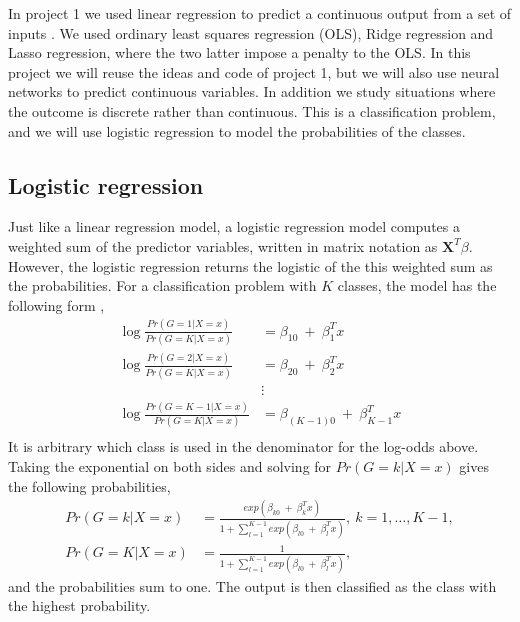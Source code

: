 In project 1 we used linear regression to predict a continuous output from a set of inputs \cite{project1-eirik-joakim,project1-vege}. We used ordinary least squares regression (OLS), Ridge regression and Lasso regression, where the two latter impose a penalty to the OLS. In this project we will reuse the ideas and code of project 1, but we will also use neural networks to predict continuous variables. In addition we study situations where the outcome is discrete rather than continuous. This is a classification problem, and we will use logistic regression to model the probabilities of the classes.\\

\subsection{Logistic regression}
Just like a linear regression model, a logistic regression model computes a weighted sum of the predictor variables, written in matrix notation as $\bm{X}^T\beta$. However, the logistic regression returns the logistic of the this weighted sum as the probabilities. For a classification problem with $K$ classes, the model has the following form \citep[p.119]{james2013introduction},
\begin{equation}\label{eqT:logreg_def}
\begin{split}
\log\frac{Pr(G=1|X=x)}{Pr(G=K|X=x)} &= \beta_{10}\ +\ \beta_{1}^Tx\\
\log\frac{Pr(G=2|X=x)}{Pr(G=K|X=x)} &= \beta_{20}\ +\ \beta_{2}^Tx\\
&\vdots\\
\log\frac{Pr(G=K-1|X=x)}{Pr(G=K|X=x)} &= \beta_{(K-1)0}\ +\ \beta_{K-1}^Tx\\
\end{split}
\end{equation}
It is arbitrary which class is used in the denominator for the log-odds above. Taking the exponential on both sides and solving for $Pr(G=k|X=x)$ gives the following probabilities,
\begin{equation}\label{eqT:logreg_prob}
\begin{split}
Pr(G=k|X=x) &= \frac{exp(\beta_{k0}\ +\ \beta_{k}^Tx)}{1+\sum_{l=1}^{K-1}exp(\beta_{l0}\ +\ \beta_{l}^Tx)},\ k=1,\dots,K-1,\\
Pr(G=K|X=x) &= \frac{1}{1+\sum_{l=1}^{K-1}exp(\beta_{l0}\ +\ \beta_{l}^Tx)},
\end{split}
\end{equation}
and the probabilities sum to one. The output is then classified as the class with the highest probability.


